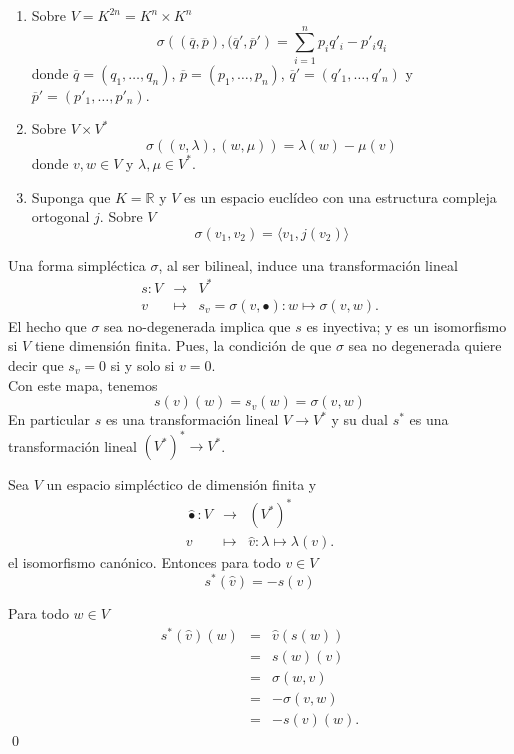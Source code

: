\begin{ejem}\label{ejem0simp}
\begin{enumerate}
\item Sobre $V=K^{2n}=K^n\times K^n$
\[
\sigma\left((\overline{q},\overline{p}),(\overline{q}',\overline{p}'\right)=\sum_{i=1}^n p_iq'_i-p'_iq_i
\]
donde $\overline{q}=(q_1,\ldots,q_n)$, $\overline{p}=(p_1,\ldots,p_n)$, $\overline{q}'=(q'_1,\ldots,q'_n)$ y $\overline{p}'=(p'_1,\ldots,p'_n)$.
\item Sobre $V\times V^*$
\[
\sigma\left((v,\lambda),(w,\mu)\right)=\lambda(w)-\mu(v)
\]
donde $v,w\in V$ y $\lambda,\mu\in V^*$.
\item Suponga que $K=\mathbb{R}$ y $V$ es un espacio eucl\'ideo con una estructura compleja ortogonal $j$. Sobre $V$
\[
\sigma(v_1,v_2)=\langle v_1,j(v_2)\rangle
\]
\end{enumerate}
\end{ejem}

\begin{obs}
Una forma simpl\'ectica $\sigma$, al ser bilineal, induce una transformaci\'on lineal
\begin{eqnarray*}
s: V & \longrightarrow & V^*\\
v & \longmapsto & s_v=\sigma(v,\bullet): w\mapsto \sigma(v,w).
\end{eqnarray*}
El hecho que $\sigma$ sea no-degenerada implica que $s$ es inyectiva; y es un isomorfismo si $V$ tiene dimensi\'on finita. Pues, la condici\'on de que $\sigma$ sea no degenerada quiere decir que $s_v=0$ si y solo si $v=0$.\\
Con este mapa, tenemos
\[
s(v)(w)=s_v(w)=\sigma(v,w)
\]
En particular $s$ es una transformaci\'on lineal $V\rightarrow V^*$ y su dual $s^*$ es una transformaci\'on lineal $\left(V^*\right)^*\rightarrow V^*$.
\end{obs}


\begin{prop}
Sea $V$ un espacio simpl\'ectico de dimensi\'on finita y
\begin{eqnarray*}
\widehat{\bullet}: V & \longrightarrow & \left(V^*\right)^*\\
                            v &\longmapsto &\widehat{v}:\lambda\mapsto\lambda(v).
\end{eqnarray*}
el isomorfismo can\'onico. Entonces para todo $v\in V$
\[
s^*(\widehat{v})=-s(v)
\]
\end{prop}

\dem Para todo $w\in V$
\begin{eqnarray*}
s^*(\widehat{v})(w)  & = & \widehat{v}(s(w))\\
  & = & s(w)(v)\\
  & = & \sigma(w,v)\\
  & = & -\sigma(v,w)\\
  & = & -s(v)(w).
\end{eqnarray*}
\qed


